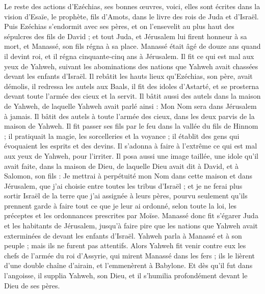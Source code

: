 \begin{multicols}{2}
Le reste des actions d'Ezéchias, ses bonnes œuvres, voici, elles sont écrites dans la vision d'Esaïe, le prophète, fils d'Amots, dans le livre des rois de Juda et d'Israël.
Puis Ezéchias s'endormit avec ses pères, et on l'ensevelit au plus haut des sépulcres des fils de David ; et tout Juda, et Jérusalem lui firent honneur à sa mort, et Manassé, son fils régna à sa place.
\VerseOne{}Manassé était âgé de douze ans quand il devint roi, et il régna cinquante-cinq ans à Jérusalem.
Il fit ce qui est mal aux yeux de Yahweh, suivant les abominations des nations que Yahweh avait chassées devant les enfants d'Israël.
Il rebâtit les hauts lieux qu'Ezéchias, son père, avait démolis, il redressa les autels aux Baals, il fit des idoles d'Astarté, et se prosterna devant toute l'armée des cieux et la servit.
Il bâtit aussi des autels dans la maison de Yahweh, de laquelle Yahweh avait parlé ainsi : Mon Nom sera dans Jérusalem à jamais.
Il bâtit des autels à toute l'armée des cieux, dans les deux parvis de la maison de Yahweh.
Il fit passer ses fils par le feu dans la vallée du fils de Hinnom ; il pratiquait la magie, les sorcelleries et la voyance ; il établit des gens qui évoquaient les esprits et des devins. Il s'adonna à faire à l'extrême ce qui est mal aux yeux de Yahweh, pour l'irriter.
Il posa aussi une image taillée, une idole qu'il avait faite, dans la maison de Dieu, de laquelle Dieu avait dit à David, et à Salomon, son fils : Je mettrai à perpétuité mon Nom dans cette maison et dans Jérusalem, que j'ai choisie entre toutes les tribus d'Israël ;
et je ne ferai plus sortir Israël de la terre que j'ai assignée à leurs pères, pourvu seulement qu'ils prennent garde à faire tout ce que je leur ai ordonné, selon toute la loi, les préceptes et les ordonnances prescrites par Moïse.
Manassé donc fit s'égarer Juda et les habitants de Jérusalem, jusqu'à faire pire que les nations que Yahweh avait exterminées de devant les enfants d'Israël.
Yahweh parla à Manassé et à son peuple ; mais ils ne furent pas attentifs.
Alors Yahweh fit venir contre eux les chefs de l'armée du roi d'Assyrie, qui mirent Manassé dans les fers ; ils le lièrent d'une double chaîne d'airain, et l'emmenèrent à Babylone.
Et dès qu'il fut dans l'angoisse, il supplia Yahweh, son Dieu, et il s'humilia profondément devant le Dieu de ses pères.

\end{multicols}
